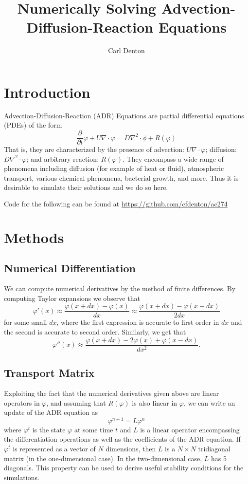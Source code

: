\documentclass[12pt]{article}
\begin{document}
\title{Numerically Solving Advection-Diffusion-Reaction Equations}
\author{Carl Denton}
\maketitle

\section{Introduction}

Advection-Diffusion-Reaction (ADR) Equations are partial differential equations (PDEs) of the form
\[\frac{\partial}{\partial t} \varphi + U\nabla \cdot \varphi = D\nabla^2\cdot\phi + R(\varphi)\]
That is, they are characterized by the presence of advection: $U\nabla \cdot \varphi$; diffusion: $D\nabla^2 \cdot \varphi$; and arbitrary reaction: $R(\varphi)$.
They encompass a wide range of phenomena including diffusion (for example of heat or fluid), atmospheric transport, various chemical phenomena, bacterial growth, and more. 
Thus it is desirable to simulate their solutions and we do so here.

\vspace{1pc}

\noindent Code for the following can be found at \url{https://github.com/cfdenton/ac274}

\section{Methods}

\subsection{Numerical Differentiation}

We can compute numerical derivatives by the method of finite differences. By computing Taylor expansions we observe that
\[\varphi'(x) \approx \frac{\varphi(x+dx) - \varphi(x)}{dx} \approx \frac{\varphi(x + dx) - \varphi(x - dx)}{2dx}\]
for some small $dx$, where the first expression is accurate to first order in $dx$ and the second is accurate to second order.
Similarly, we get that
\[\varphi''(x) \approx \frac{\varphi(x+dx) - 2 \varphi(x) + \varphi(x - dx)}{dx^2}.\]

\subsection{Transport Matrix}

Exploiting the fact that the numerical derivatives given above are linear operators in $\varphi$, and assuming that $R(\varphi)$ is also linear in $\varphi$, we can write an update of the ADR equation as
\[\varphi^{n+1} = L\varphi^n\]
where $\varphi^t$ is the state $\varphi$ at some time $t$ and $L$ is a linear operator encompassing the differentiation operations as well as the coefficients of the ADR equation.
If $\varphi^t$ is represented as a vector of $N$ dimensions, then $L$ is a $N\times N$ tridiagonal matrix (in the one-dimensional case). In the two-dimensional case, $L$ has 5 diagonals.
This property can be used to derive useful stability conditions for the simulations.
\end{document}
